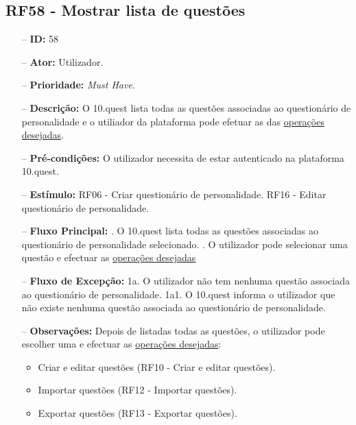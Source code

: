 \subsection{RF58 - Mostrar lista de questões}
\begin{itemize}
	\item[--] \textbf{ID:} 58
	\item[--]  \textbf{Ator:} Utilizador.
	\item[--]  \textbf{Prioridade:} \textit{Must Have}.
	\item[--]  \textbf{Descrição:} O 10.quest lista todas as questões associadas ao questionário de personalidade e o utiliador da plataforma pode efetuar as das \underline{operações desejadas}.
	\item[--]  \textbf{Pré-condições:} O utilizador necessita de estar autenticado na plataforma 10.quest.
	\item[--]  \textbf{Estímulo:} 
		\subitem RF06 - Criar questionário de personalidade.
		\subitem RF16 - Editar questionário de personalidade.
	\item[--]  \textbf{Fluxo Principal:} 
		. O 10.quest lista todas as questões associadas ao questionário de personalidade selecionado.
		. O utilizador pode selecionar uma questão e efectuar as \underline{operações desejadas}
	\item[--]  \textbf{Fluxo de Excepção:} 
		\subitem 1a. O utilizador não tem nenhuma questão associada ao questionário de personalidade.
		\subitem 1a1. O 10.quest informa o utilizador que não existe nenhuma questão associada ao questionário de personalidade.
	\item[--]  \textbf{Observações:} Depois de listadas todas as questões, o utilizador pode escolher uma e efectuar as \underline{operações desejadas}:
		\begin{itemize}
			\item Criar e editar questões (RF10 - Criar e editar questões).
			\item Importar questões (RF12 - Importar questões).
			\item Exportar questões (RF13 - Exportar questões).
		\end{itemize}
\end{itemize}
\newpage

